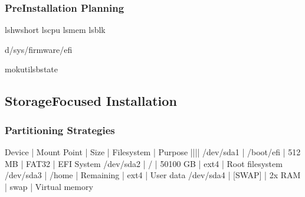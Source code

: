 \documentclass[letterpaper,10pt,english]{sphinxmanual}
\begin{document}
\subsubsection{Pre\sphinxhyphen{}Installation Planning}
\label{\detokenize{ubuntu-setup:pre-installation-planning}}
\begin{sphinxVerbatim}[commandchars=\\\{\}]
lshw\PYGZhy{}short
lscpu
lsmem
lsblk

\PYG{o}{[}\PYGZhy{}d/sys/firmware/efi\PYG{o}{]}

mokutil\PYGZhy{}\PYGZhy{}sb\PYGZhy{}state
\end{sphinxVerbatim}


\subsection{Storage\sphinxhyphen{}Focused Installation}
\label{\detokenize{ubuntu-setup:storage-focused-installation}}

\subsubsection{Partitioning Strategies}
\label{\detokenize{ubuntu-setup:partitioning-strategies}}
\sphinxAtStartPar
{}

\begin{sphinxVerbatim}[commandchars=\\\{\}]
Device    | Mount Point | Size      | Filesystem | Purpose
\PYGZhy{}\PYGZhy{}\PYGZhy{}\PYGZhy{}\PYGZhy{}\PYGZhy{}\PYGZhy{}\PYGZhy{}\PYGZhy{}\PYGZhy{}|\PYGZhy{}\PYGZhy{}\PYGZhy{}\PYGZhy{}\PYGZhy{}\PYGZhy{}\PYGZhy{}\PYGZhy{}\PYGZhy{}\PYGZhy{}\PYGZhy{}\PYGZhy{}\PYGZhy{}|\PYGZhy{}\PYGZhy{}\PYGZhy{}\PYGZhy{}\PYGZhy{}\PYGZhy{}\PYGZhy{}\PYGZhy{}\PYGZhy{}\PYGZhy{}\PYGZhy{}|\PYGZhy{}\PYGZhy{}\PYGZhy{}\PYGZhy{}\PYGZhy{}\PYGZhy{}\PYGZhy{}\PYGZhy{}\PYGZhy{}\PYGZhy{}\PYGZhy{}\PYGZhy{}|\PYGZhy{}\PYGZhy{}\PYGZhy{}\PYGZhy{}\PYGZhy{}\PYGZhy{}\PYGZhy{}\PYGZhy{}\PYGZhy{}\PYGZhy{}\PYGZhy{}\PYGZhy{}\PYGZhy{}\PYGZhy{}\PYGZhy{}\PYGZhy{}\PYGZhy{}\PYGZhy{}
/dev/sda1 | /boot/efi   | 512 MB    | FAT32      | EFI System
/dev/sda2 | /           | 50\PYGZhy{}100 GB | ext4       | Root filesystem
/dev/sda3 | /home       | Remaining | ext4       | User data
/dev/sda4 | [SWAP]      | 2x RAM    | swap       | Virtual memory
\end{sphinxVerbatim}
\end{document}
